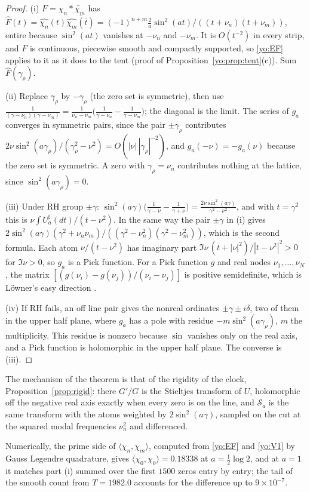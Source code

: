 \begin{proof}
(i) $F=\chi_n*\widetilde{\chi_m}$ has $\widehat F(t)=\widehat{\chi_n}(t)\overline{\widehat{\chi_m}(\overline t)}=(-1)^{n+m}\frac2a\sin^2(at)/((t+\nu_n)(t+\nu_m))$, entire because $\sin^2(at)$ vanishes at $-\nu_n$ and $-\nu_m$. It is $O(t^{-2})$ in every strip, and $F$ is continuous, piecewise smooth and compactly supported, so \eqref{yo:EF} applies to it as it does to the tent (proof of Proposition~\ref{yo:prop:tent}(c)). Sum $\widehat F(\gamma_\rho)$.

(ii) Replace $\gamma_\rho$ by $-\gamma_\rho$ (the zero set is symmetric), then use $\frac1{(\gamma-\nu_n)(\gamma-\nu_m)}=\frac1{\nu_n-\nu_m}\bigl(\frac1{\gamma-\nu_n}-\frac1{\gamma-\nu_m}\bigr)$; the diagonal is the limit. The series of $g_a$ converges in symmetric pairs, since the pair $\pm\gamma_\rho$ contributes $2\nu\sin^2(a\gamma_\rho)/(\gamma_\rho^2-\nu^2)=O(|\nu|\,|\gamma_\rho|^{-2})$, and $g_a(-\nu)=-g_a(\nu)$ because the zero set is symmetric. A zero with $\gamma_\rho=\nu_n$ contributes nothing at the lattice, since $\sin^2(a\gamma_\rho)=0$.

(iii) Under RH group $\pm\gamma$: $\sin^2(a\gamma)\bigl(\frac1{\gamma-\nu}-\frac1{\gamma+\nu}\bigr)=\frac{2\nu\sin^2(a\gamma)}{\gamma^2-\nu^2}$, and with $t=\gamma^2$ this is $\nu\int U_a^\sharp(dt)/(t-\nu^2)$. In the same way the pair $\pm\gamma$ in (i) gives $2\sin^2(a\gamma)(\gamma^2+\nu_n\nu_m)/((\gamma^2-\nu_n^2)(\gamma^2-\nu_m^2))$, which is the second formula. Each atom $\nu/(t-\nu^2)$ has imaginary part $\Im\nu\,(t+|\nu|^2)/|t-\nu^2|^2>0$ for $\Im\nu>0$, so $g_a$ is a Pick function. For a Pick function $g$ and real nodes $\nu_1,\dots,\nu_N$, the matrix $[(g(\nu_i)-g(\nu_j))/(\nu_i-\nu_j)]$ is positive semidefinite, which is L\"owner's easy direction \cite{Lowner34,Donoghue74}.

(iv) If RH fails, an off line pair gives the nonreal ordinates $\pm\gamma\pm i\delta$, two of them in the upper half plane, where $g_a$ has a pole with residue $-m\sin^2(a\gamma_\rho)$, $m$ the multiplicity. This residue is nonzero because $\sin$ vanishes only on the real axis, and a Pick function is holomorphic in the upper half plane. The converse is (iii).
\end{proof}

The mechanism of the theorem is that of the rigidity of the clock, Proposition~\ref{prop:rigid}: there $G'/G$ is the Stieltjes transform of $U$, holomorphic off the negative real axis exactly when every zero is on the line, and $\mathcal S_a$ is the same transform with the atoms weighted by $2\sin^2(a\gamma)$, sampled on the cut at the squared modal frequencies $\nu_n^2$ and differenced.

Numerically, the prime side of $\langle\chi_n,\chi_m\rangle$, computed from \eqref{yo:EF} and \eqref{yo:V1} by Gauss Legendre quadrature, gives $\langle\chi_0,\chi_0\rangle=0.18338$ at $a=\frac12\log2$, and at $a=1$ it matches part (i) summed over the first $1500$ zeros entry by entry; the tail of the smooth count from $T=1982.0$ accounts for the difference up to $9\times10^{-7}$.
